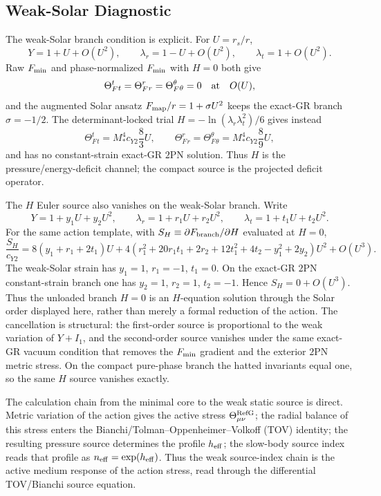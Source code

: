 \documentclass[12pt,a4paper]{article}
\begin{document}
\subsection{Weak-Solar Diagnostic}

The weak-Solar branch condition is explicit. For $U=r_s/r$,
\[
Y=1+U+O(U^2),\qquad
\lambda_r=1-U+O(U^2),\qquad
\lambda_t=1+O(U^2).
\]
Raw $F_{\rm min}$ and phase-normalized $F_{\rm min}$ with $H=0$ both give
\[
\Theta_F^t{}_t=\Theta_F^r{}_r=\Theta_F^\theta{}_\theta=0
\quad {\rm at}\quad O(U),
\]
and the augmented Solar ansatz $F_{\rm map}/r=1+\sigma U^2$ keeps the
exact-GR branch $\sigma=-1/2$. The determinant-locked trial
$H=-\ln(\lambda_r\lambda_t^2)/6$ gives instead
\[
\Theta_F^t{}_t=M_*^4c_{Y2}\frac{8}{3}U,\qquad
\Theta_F^r{}_r=\Theta_F^\theta{}_\theta=M_*^4c_{Y2}\frac{8}{9}U,
\]
and has no constant-strain exact-GR $2$PN solution. Thus $H$ is the
pressure/energy-deficit channel; the compact source is the projected deficit
operator.

The $H$ Euler source also vanishes on the weak-Solar branch. Write
\[
Y=1+y_1U+y_2U^2,\qquad
\lambda_r=1+r_1U+r_2U^2,\qquad
\lambda_t=1+t_1U+t_2U^2.
\]
For the same action template, with
$S_H\equiv\partial F_{\rm branch}/\partial H$ evaluated at $H=0$,
\[
\frac{S_H}{c_{Y2}}
=8(y_1+r_1+2t_1)U
+4\left(r_1^2+20r_1t_1+2r_2+12t_1^2+4t_2-y_1^2+2y_2\right)U^2
+O(U^3).
\]
The weak-Solar strain has $y_1=1$, $r_1=-1$, $t_1=0$. On the exact-GR $2$PN
constant-strain branch one has $y_2=1$, $r_2=1$, $t_2=-1$. Hence
$S_H=0+O(U^3)$. Thus the unloaded branch $H=0$ is an $H$-equation solution
through the Solar order displayed here, rather than merely a formal reduction of the action.
The cancellation is structural: the first-order source is proportional to the
weak variation of $Y+I_1$, and the second-order source vanishes under the same
exact-GR vacuum condition that removes the $F_{\rm min}$ gradient and the
exterior $2$PN metric stress.
On the compact pure-phase branch the hatted invariants equal one, so the same
$H$ source vanishes exactly.

The calculation chain from the minimal core to the weak static source is direct. Metric variation of the action gives the active stress $\Theta^{\rm RefG}_{\mu\nu}$; the radial balance of this stress enters the Bianchi/Tolman--Oppenheimer--Volkoff (TOV) identity; the resulting pressure source determines the profile $h_{\rm eff}$; the slow-body source index reads that profile as $n_{\rm eff}=\exp(h_{\rm eff})$. Thus the weak source-index chain is the active medium response of the action stress, read through the differential TOV/Bianchi source equation.
\end{document}

